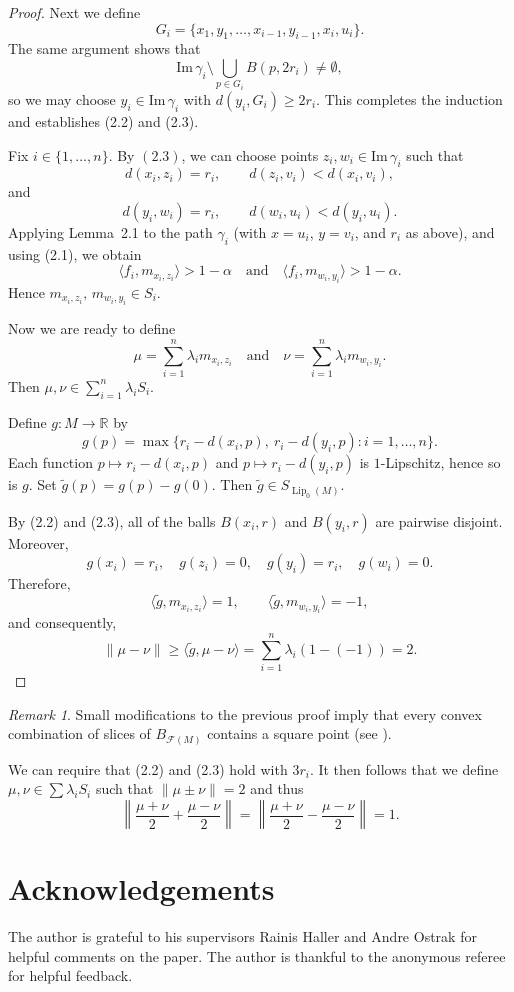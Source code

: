 \documentclass[a4paper,12pt]{amsart}
\theoremstyle{plain}
\theoremstyle{definition}
\theoremstyle{remark}
\newtheorem{rem}[thm]{Remark}
\numberwithin{equation}{section}
\begin{document}
\begin{proof}
Next we define
\[
G_i=\{x_1,y_1,\dots,x_{i-1},y_{i-1},x_i,u_i\}.
\]
The same argument shows that
\[
\mathrm{Im}\,\gamma_i
\setminus\bigcup_{p\in G_i} B(p,2r_i)
\neq\emptyset,
\]
so we may choose $y_i\in\mathrm{Im}\,\gamma_i$
with $d(y_i,G_i)\ge 2r_i$.
This completes the induction and establishes (2.2) and (2.3).

Fix $i\in \{1,\ldots,n\}$. 
By $(2.3)$, we can choose points $z_i,w_i\in\mathrm{Im}\,\gamma_i$
such that
\[
d(x_i,z_i)=r_i,
\qquad
d(z_i,v_i)<d(x_i,v_i),
\]
and
\[
d(y_i,w_i)=r_i,\qquad d(w_i,u_i)<d(y_i,u_i).\]
Applying Lemma~2.1 to the path $\gamma_i$
(with $x=u_i$, $y=v_i$, and $r_i$ as above),
and using (2.1), we obtain
\[
\langle f_i,m_{x_i,z_i}\rangle>1-\alpha
\quad\text{and}\quad
\langle f_i,m_{w_i,y_i}\rangle>1-\alpha.
\]
Hence $m_{x_i,z_i},\, m_{w_i,y_i}\in S_i.$

Now we are ready to define
\[
\mu=\sum_{i=1}^n\lambda_i m_{x_i,z_i}
\quad\text{and}\quad
\nu=\sum_{i=1}^n\lambda_i m_{w_i,y_i}.
\]
Then $\mu,\nu\in\sum_{i=1}^n\lambda_i S_i$.

Define $g:M\to\mathbb R$ by
\[
g(p)=\max\bigl\{ r_i-d(x_i,p),\ r_i-d(y_i,p): i=1,\dots,n\bigr\}.
\]
Each function $p\mapsto r_i-d(x_i,p)$ and $p\mapsto r_i-d(y_i,p)$
is $1$-Lipschitz, hence so is $g$. Set $\tilde g(p)=g(p)-g(0)$. Then 
$\tilde g\in S_{\operatorname{Lip}_0(M)}$.

By (2.2) and (2.3), all of the balls $B(x_i,r)$ and $B(y_i,r)$ are pairwise disjoint.
Moreover,
\[
g(x_i)=r_i,\quad g(z_i)=0,
\quad
g(y_i)=r_i,\quad g(w_i)=0.
\]
Therefore,
\[
\langle \tilde g,m_{x_i,z_i}\rangle=1,
\qquad
\langle \tilde g,m_{w_i,y_i}\rangle=-1,
\]
and consequently,
\[\|\mu-\nu\|\geq
\langle \tilde g,\mu-\nu\rangle
=\sum_{i=1}^n\lambda_i(1-(-1))=2.
\]

 
\end{proof}
\begin{rem}
    Small modifications to the previous proof imply that every convex combination of slices of $B_{\mathcal{F}(M)}$ contains a square point (see \cite[Definition 3.1]{MR4787365}). 
    
    We can require that (2.2) and (2.3) hold with $3r_i$. It then follows that we define $\mu,\nu\in \sum \lambda_i S_i$ such that $\|\mu\pm \nu\|=2$ and thus 
    \[
    \left\|\frac{\mu+\nu}{2}+ \frac{\mu-\nu}{2}\right\|=\left\|\frac{\mu+\nu}{2}- \frac{\mu-\nu}{2}\right\|=1.
    \]
\end{rem}
\section*{Acknowledgements}
The author is grateful to his supervisors Rainis Haller  and Andre Ostrak for helpful comments on the paper. The author is thankful to the anonymous referee for helpful feedback.  
\end{document}
